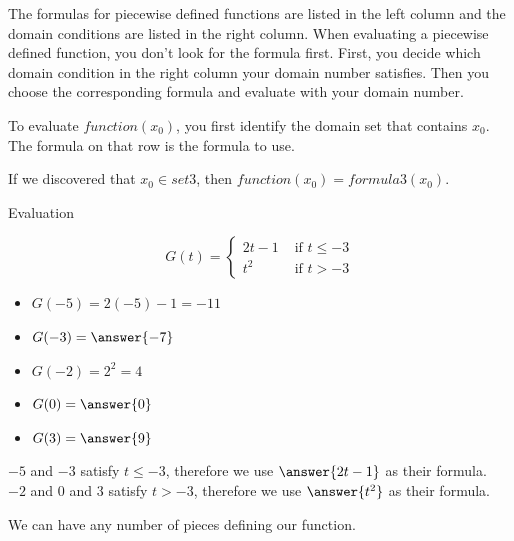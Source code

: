 \documentclass{ximera}
\begin{document}
The formulas for piecewise defined functions are listed in the left column and the domain conditions are listed in the right column.  When evaluating a piecewise defined function, you don't look for the formula first.  First, you decide which domain condition in the right column your domain number satisfies.  Then you choose the corresponding formula and evaluate with your domain number.


To evaluate $function(x_0)$, you first identify the domain set that contains $x_0$.  The formula on that row is the formula to use. 

If we discovered that $x_0 \in set3$, then $function(x_0) = formula3(x_0)$. 









\begin{example} Evaluation

\[
G(t) = 
\begin{cases}
  2t-1 & \text{ if } t \leq -3 \\
  t^2 & \text{ if } t > -3
\end{cases}
\]


\begin{itemize}
\item $G(-5) = 2(-5) - 1 = -11$  
\item $G(-3) = \answer{-7}$ 
\item $G(-2) = 2^2 = 4$ 
\item $G(0) = \answer{0}$ 
\item $G(3) = \answer{9}$ 
\end{itemize}


$-5$ and $-3$ satisfy $t \leq -3$, therefore we use $\answer{2t-1}$ as their formula. \\
$-2$ and $0$ and $3$ satisfy $t > -3$, therefore we use $\answer{t^2}$ as their formula. 

\end{example}


We can have any number of pieces defining our function.
\end{document}
